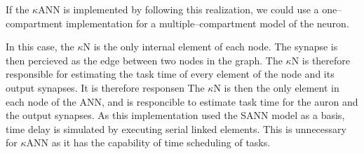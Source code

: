 		If the $\kappa$ANN is implemented by following this realization, we could use a one--compartment implementation for a multiple--compartment model of the neuron.

		In this case, the $\kappa$N is the only internal element of each node. The synapse is then percieved as the edge between two nodes in the graph.
		The $\kappa$N is therefore responsible for estimating the task time of every element of the node and its output synapses.
		It is therefore responsen
		The $\kappa$N is then the only element in each node of the ANN, and is responcible to estimate task time for the auron and the output synapses.
		As this implementation used the SANN model as a basis, time delay is simulated by executing serial linked elements.
		This is unnecessary for $\kappa$ANN as it has the capability of time scheduling of tasks.





